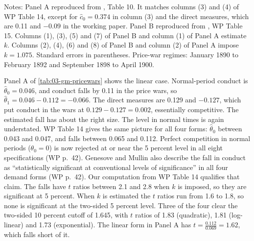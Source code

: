 \begin{table}[!htb]
\smallskip
\begin{minipage}{0.92\textwidth}\footnotesize
Notes: Panel A reproduced from \citet{GenesoveMullin1998}, Table 10. It matches columns (3) and (4) of WP
Table 14, except for $\hat c_0 = 0.374$ in column (3) and the direct measures, which are 0.11 and $-0.09$ in
the working paper. Panel B reproduced from \citet{GenesoveMullin1995}, WP Table 15. Columns (1), (3), (5) and (7)
of Panel B and column (1) of Panel A estimate $k$. Columns (2), (4), (6) and (8) of Panel B and column (2) of
Panel A impose $k = 1.075$. Standard errors in parentheses.
Price-war regimes: January 1890 to February 1892 and September 1898 to April 1900.
\end{minipage}
\end{table}

Panel A of \cref{tab:03-gm-pricewars} shows the linear case. Normal-period conduct is $\hat\theta_0 = 0.046$,
and conduct falls by 0.11 in the price wars, so $\hat\theta_1 = 0.046 - 0.112 = -0.066$. The direct measures
are 0.129 and $-0.127$, which put conduct in the wars at $0.129 - 0.127 = 0.002$, essentially competitive.
The estimated fall has about the right size. The level in normal times is again understated. WP Table 14
gives the same picture for all four forms: $\hat\theta_0$ between 0.043 and 0.047, and falls between 0.065
and 0.112. Perfect competition in normal periods ($\theta_0 = 0$) is now rejected at or near the 5 percent
level in all eight specifications (WP p.~42). Genesove and Mullin also describe the fall in conduct as
``statistically significant at conventional levels of significance'' in all four demand forms (WP p.~42). Our
computation from WP Table 14 qualifies that claim. The falls have $t$ ratios between 2.1 and 2.8 when $k$ is
imposed, so they are significant at 5 percent. When $k$ is estimated the $t$ ratios run from 1.6 to 1.8, so none is
significant at the two-sided 5 percent level. Three of the four clear the two-sided 10 percent cutoff of 1.645, with
$t$ ratios of 1.83 (quadratic), 1.81 (log-linear) and 1.73 (exponential). The linear form
in Panel A has $t = \frac{0.112}{0.069} = 1.62$, which falls short of it.

